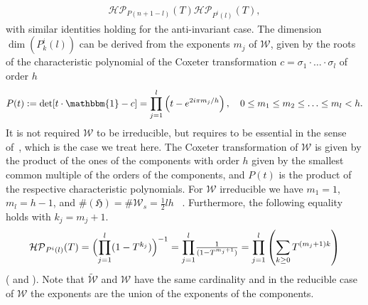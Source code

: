\documentclass[11pt,a4paper,times]{amsart}
\theoremstyle{plain}
\theoremstyle{definition}
\numberwithin{equation}{section}
\newcommand{\ds}{\displaystyle}
\newcommand{\dsum}{\ds\sum}
\newcommand{\txtg}{\textcolor{green}}
\begin{document}
{\begin{equation}
\begin{array}{l}
\mathcal{HP}_{P(n+1-l)}(T)\mathcal{HP}_{P^{i}(l)}(T),
\end{array}
\end{equation}
with similar identities holding for the anti-invariant case.
The dimension $\dim(P^i_k(l))$ can be derived from the exponents  $m_j$ of $\mathcal{W}$, given by the roots of the characteristic
polynomial of the Coxeter transformation $c=\sigma_1\cdot \ldots\cdot \sigma_l$ of order $h$
\begin{equation}\label{EXPO}
 P(t):=\det[ t\cdot \mathbbm{1}-c]={\ds \prod_{j=1}^l}\left(t- e^{2i\pi m_j/h}\right), \quad
0\leq m_1\leq m_2\leq\ldots \leq m_l<h.
\end{equation}
It is not  required  $\mathcal{W}$ to be irreducible, but requires to be essential in the sense of~\cite[V.3.7 p.83]{BOU},  
which is the case we treat here.
The Coxeter transformation of  $\mathcal{W}$ is given by the product of the ones of the  components  with order $h$ given by the smallest common multiple of the orders of the components,  and $P(t)$ is the product of the respective characteristic polynomials. 
For $\mathcal{W}$ irreducible we have
$ m_1=1$, $m_l=h-1$, and $\#(\mathfrak{H})=\#\mathcal{W}_s=\frac{1}{2}lh$
~\cite[Theorem 1, p.119]{BOU}.
Furthermore, the following equality holds with  $k_j=m_j+1$.
\begin{equation}\label{NOTYET}
\begin{array}{l}
\mathcal{HP}_{P^i(l)}(T) = \Big{(}{\ds \prod_{j=1}^l}(1-T^{k_j})\Big{)}^{-1}={\ds \prod_{j=1}^l}\frac{1}{(1-T^{m_j+1})}=
{\ds \prod_{j=1}^l}\left(\dsum_{k\geq 0} T^{(m_j+1)k}\right)
\end{array}
\end{equation}
(\cite[p.103, p.107, Prop. 3 p. 121]{BOU} and \cite[C.2, p.\ 241 and 244 Preuve, Remarque]{bb}). 
Note that $\tilde{\mathcal{W}}$ and $\mathcal{W}$ have the same cardinality and in the reducible case of $\mathcal{W}$ the exponents are the union of the exponents  of the components.

}
\end{document}
